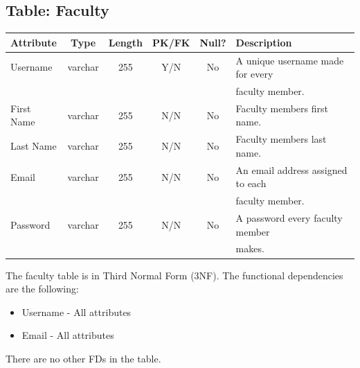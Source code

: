 \documentclass[letterpaper,12pt,oneside,listof=totoc]{scrreprt}
\begin{document}
\subsection{Table: Faculty}
\begin{table}[h]
    \centering
    \begin{tabular}{|l|c|c|c|c|l|}
        \hline
        \textbf{Attribute} & \textbf{Type} & \textbf{Length} & \textbf{PK/FK} & \textbf{Null?} & \textbf{Description}
        \\
        \hline
         Username & varchar & 255 & Y/N & No & A unique username made for every \\ &&&&& faculty member.
        \\
        \hline
        First Name & varchar & 255 & N/N & No & Faculty members first name.
        \\
        \hline
        Last Name & varchar & 255 & N/N & No & Faculty members last name.
        \\
        \hline
        Email & varchar & 255 & N/N & No & An email address assigned to each \\ &&&&& faculty member.
        \\
        \hline
        Password & varchar & 255 & N/N & No & A password every faculty member \\ &&&&& makes. 
        \\
        \hline
    \end{tabular}
\end{table}

The faculty table is in Third Normal Form (3NF). The functional dependencies are the following:
\begin{itemize}
  \item Username - All attributes
  \item Email - All attributes
\end{itemize}
There are no other FDs in the table.
\end{document}
